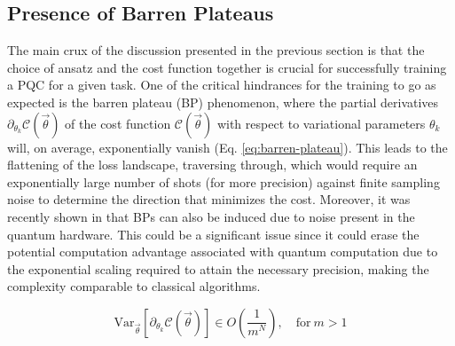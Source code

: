 \documentclass[%
 reprint,
 amsmath,
 amssymb,
 showkeys,
 pra,
 floatfix,
]{revtex4-2}
\begin{document}
\subsection{Presence of Barren Plateaus}

The main crux of the discussion presented in the previous section is that the choice of ansatz and the cost function together is crucial for successfully training a PQC for a given task. One of the critical hindrances for the training to go as expected is the barren plateau (BP) phenomenon, where the partial derivatives $\partial_{\theta_k}\mathcal{C}(\vec{\theta})$ of the cost function $\mathcal{C}(\vec{\theta})$ with respect to variational parameters $\theta_k$ will, on average, exponentially vanish (Eq. \ref{eq:barren-plateau}). This leads to the flattening of the loss landscape, traversing through, which would require an exponentially large number of shots (for more precision) against finite sampling noise to determine the direction that minimizes the cost. Moreover, it was recently shown in \cite{2020arXiv200714384W} that BPs can also be induced due to noise present in the quantum hardware. This could be a significant issue since it could erase the potential computation advantage associated with quantum computation due to the exponential scaling required to attain the necessary precision, making the complexity comparable to classical algorithms.

\begin{equation}\label{eq:barren-plateau}
	\text{Var}_{\vec{\theta}}[\partial_{\theta_k}\mathcal{C}(\vec{\theta})] \in O\left(\frac{1}{m^N}\right),\quad \text{for}\ m > 1
\end{equation}
\end{document}
